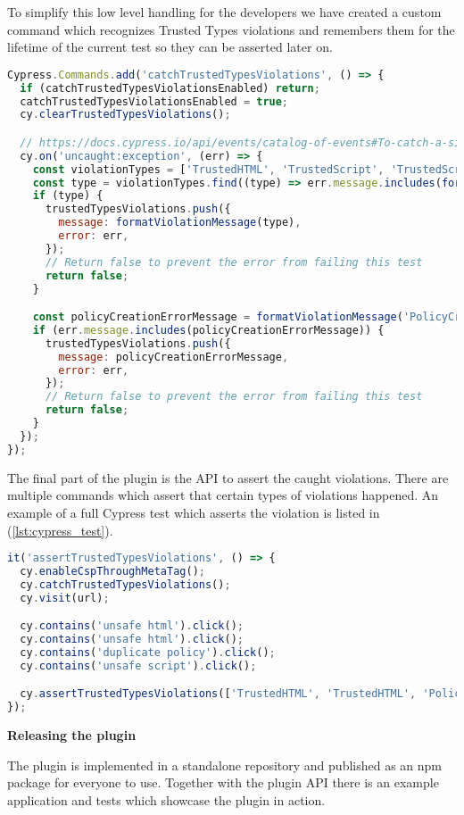 To simplify this low level handling for the developers we have created a custom command which
recognizes Trusted Types violations and remembers them for the lifetime of the current test so they
can be asserted later on.

\bigskip
\begin{lstlisting}[language=JavaScript, caption=Custom command to catch Trusted Types violations]
Cypress.Commands.add('catchTrustedTypesViolations', () => {
  if (catchTrustedTypesViolationsEnabled) return;
  catchTrustedTypesViolationsEnabled = true;
  cy.clearTrustedTypesViolations();

  // https://docs.cypress.io/api/events/catalog-of-events#To-catch-a-single-uncaught-exception
  cy.on('uncaught:exception', (err) => {
    const violationTypes = ['TrustedHTML', 'TrustedScript', 'TrustedScriptURL'] as const;
    const type = violationTypes.find((type) => err.message.includes(formatViolationMessage(type)));
    if (type) {
      trustedTypesViolations.push({
        message: formatViolationMessage(type),
        error: err,
      });
      // Return false to prevent the error from failing this test
      return false;
    }

    const policyCreationErrorMessage = formatViolationMessage('PolicyCreation');
    if (err.message.includes(policyCreationErrorMessage)) {
      trustedTypesViolations.push({
        message: policyCreationErrorMessage,
        error: err,
      });
      // Return false to prevent the error from failing this test
      return false;
    }
  });
});
\end{lstlisting}

The final part of the plugin is the API to assert the caught violations. There are multiple commands
which assert that certain types of violations happened. An example of a full Cypress test which
asserts the violation is listed in (\ref{lst:cypress_test}).

\bigskip
\begin{lstlisting}[language=JavaScript, caption=Example Trusted Types violation test, label={lst:cypress_test}]
it('assertTrustedTypesViolations', () => {
  cy.enableCspThroughMetaTag();
  cy.catchTrustedTypesViolations();
  cy.visit(url);

  cy.contains('unsafe html').click();
  cy.contains('unsafe html').click();
  cy.contains('duplicate policy').click();
  cy.contains('unsafe script').click();

  cy.assertTrustedTypesViolations(['TrustedHTML', 'TrustedHTML', 'PolicyCreation', 'TrustedScript']);
});
\end{lstlisting}

\begin{flushleft}\textbf {Releasing the plugin}\end{flushleft}

The plugin is implemented in a standalone repository \cite{cypress-trusted-types:github} and
published as an npm package \cite{cypress-trusted-types:npm} for everyone to use. Together with the
plugin API there is an example application and tests which showcase the plugin in action.
